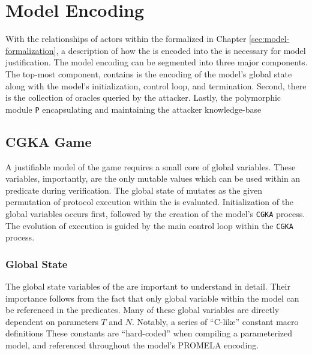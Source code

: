 \hypertarget{sec:model-encoding}{%
\chapter{Model Encoding}\label{sec:model-encoding}}

With the relationships of actors within the \CGKAsec formalized in Chapter \ref{sec:model-formalization}, a description of how the \CGKAsec is encoded into the  is necessary for model justification.
The  model encoding can be segmented into three major components.
The top-most component, contains is the encoding of the model's global state along with the model's initialization, control loop, and termination.
Second, there is the collection of oracles queried by the attacker.
Lastly, the polymorphic module \texttt{P} encapsulating and maintaining the attacker knowledge-base


\hypertarget{sec:game-oracles}{%
\section{CGKA Game}\label{sec:game-oracles}}

A justifiable model of the \CGKAsec game requires a small core of global variables.
These variables, importantly, are the only mutable values which can be used within an  predicate during verification.
The global state of mutates as the given permutation of protocol execution within the \CGKAsec is evaluated.
Initialization of the global variables occurs first, followed by the creation of the model's \texttt{CGKA} process.
The evolution of execution is guided by the main control loop within the \texttt{CGKA} process.


\hypertarget{subsec:global-state}{%
\subsection{Global State}\label{subsec:global-state}}

The global state variables of the  are important to understand in detail.
Their importance follows from the fact that only global variable within the  model can be referenced in the  predicates.
Many of these global variables are directly dependent on parameters \(T\) and \(N\).
Notably, a series of ``C-like'' constant macro definitions
These constants are ``hard-coded'' when compiling a parameterized model, and referenced throughout the model's PROMELA encoding.

